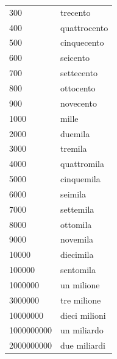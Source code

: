 \documentclass[10pt]{scrartcl}
\begin{document}
\begin{multicols*}{2}
\begin{supertabular}{p{4cm}p{4cm}}
300 & trecento\\
400 & quattrocento\\
500 & cinquecento\\
600 & seicento\\
700 & settecento\\
800 & ottocento\\
900 & novecento\\
1000 & mille\\
2000 & duemila\\
3000 & tremila\\
4000 & quattromila\\
5000 & cinquemila\\
6000 & seimila\\
7000 & settemila\\
8000 & ottomila\\
9000 & novemila\\
10000 & diecimila\\
100000& sentomila\\
1000000 & un milione\\
3000000 & tre milione\\
10000000 & dieci milioni\\
1000000000 & un miliardo\\
2000000000 & due miliardi\\
\end{supertabular}

\end{multicols*}
\end{document}
